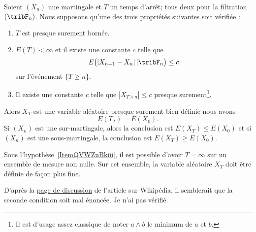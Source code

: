 \begin{theorem} \label{ThoZTrdjtZ}
    Soient \( (X_n)\) une martingale et \( T\) un temps d'arrêt; tous deux pour la filtration \( (\tribF_n)\). Nous supposons qu'une des trois propriétés suivantes soit vérifiée :
    \begin{enumerate}
        \item
            \( T\) est presque surement bornée.
        \item
            \( E(T)<\infty\) et il existe une constante \( c\) telle que
            \begin{equation}
                E\big( | X_{n+1}-X_n |\,|\tribF_n \big)\leq c
            \end{equation}
            sur l'événement \( \{ T\geq n \}\).
        \item   \label{ItemQVWZuBkiii}
            Il existe une constante \( c\) telle que \( | X_{T\wedge n} |\leq c\) presque surement\footnote{Il est d'usage assez classique de noter \( a\wedge b\) le minimum de \( a\) et \( b\).}.
    \end{enumerate}
    Alors \( X_T\) est une variable aléatoire presque surement bien définie nous avons
    \begin{equation}
        E(T_T)=E(X_0).
    \end{equation}
    Si \( (X_n)\) est une sur-martingale, alors la conclusion est \( E(X_T)\leq E(X_0)\) et si \( (X_n)\) est une sous-martingale, la conclusion est \( E(X_T)\geq E(X_0)\).
\end{theorem}

\begin{remark}
    Sous l'hypothèse~\ref{ItemQVWZuBkiii}, il est possible d'avoir \( T=\infty\) sur un ensemble de mesure non nulle. Sur cet ensemble, la variable aléatoire \( X_T\) doit être définie de façon plus fine.
\end{remark}

\begin{probleme}
    D'après la \href{https://en.wikipedia.org/wiki/Talk:Optional_stopping_theorem}{page de discussion} de l'article sur Wikipédia, il semblerait que la seconde condition soit mal énoncée. Je n'ai pas vérifié.
\end{probleme}

